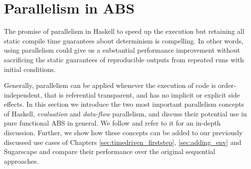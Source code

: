 \chapter{Parallelism in ABS}
\label{ch:parallelism_ABS}
The promise of parallelism in Haskell to speed up the execution but retaining all static compile time guarantees about determinism is compelling. In other words, using parallelism could give us a substantial performance improvement without sacrificing the static guarantees of reproducible outputs from repeated runs with initial conditions.

Generally, parallelism can be applied whenever the execution of code is order-independent, that is referential transparent, and has no implicit or explicit side effects. In this section we introduce the two most important parallelism concepts of Haskell, \textit{evaluation} and \textit{data-flow} parallelism, and discuss their potential use in pure functional ABS in general. We follow \cite{marlow_parallel_2013} and refer to it for an in-depth discussion. Further, we show how these concepts can be added to our previously discussed use cases of Chapters \ref{sec:timedriven_firststep}, \ref{sec:adding_env} and Sugarscape and compare their performance over the original sequential approaches.





%
%




